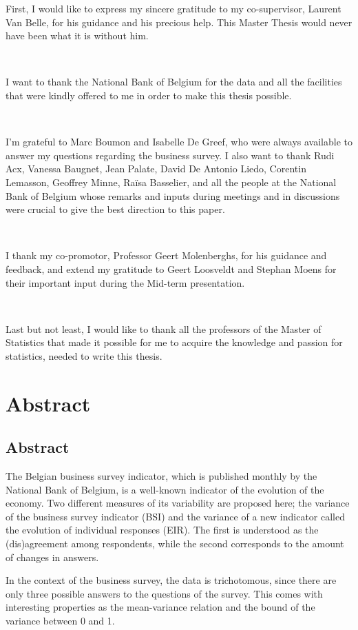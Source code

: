 \documentclass[12pt,a4paper,oneside]{book}
\begin{document}
First, I would like to express my sincere gratitude to my co-supervisor, Laurent Van Belle, for his guidance and his precious help. This Master Thesis would never have been what it is without him. 

\ 

I want to thank the National Bank of Belgium for the data and all the facilities that were kindly offered to me in order to make this thesis possible.

\

I'm grateful to Marc Boumon and Isabelle De Greef, who were always available to answer my questions regarding the business survey. 
I also want to thank Rudi Acx, 
Vanessa Baugnet, 
Jean Palate, 
David De Antonio Liedo, 
Corentin Lemasson,
Geoffrey Minne,
Raïsa Basselier,
and all the people at the National Bank of Belgium whose remarks and inputs during meetings and in discussions were crucial to give the best direction to this paper. 

\

I thank my co-promotor, Professor Geert Molenberghs, for his guidance and feedback, and extend my gratitude to Geert Loosveldt and Stephan Moens for their important input during the Mid-term presentation.

\

Last but not least, I would like to thank all the professors of the Master of Statistics that made it possible for me to acquire the knowledge and passion for statistics, needed to write this thesis. 


\chapter*{Abstract}



\section*{Abstract}

The Belgian business survey indicator, which is published monthly by the National Bank of Belgium, is a well-known indicator of the evolution of the economy.
Two different measures of its variability are proposed here; the variance of the business survey indicator (BSI) and the variance of a new indicator called the evolution of individual responses (EIR).
The first is understood as the (dis)agreement among respondents, while the second corresponds to the amount of changes in answers.

In the context of the business survey, the data is trichotomous, since there are only three possible answers to the questions of the survey. 
This comes with interesting properties as the mean-variance relation
and the bound of the variance between 0 and 1.
\end{document}
